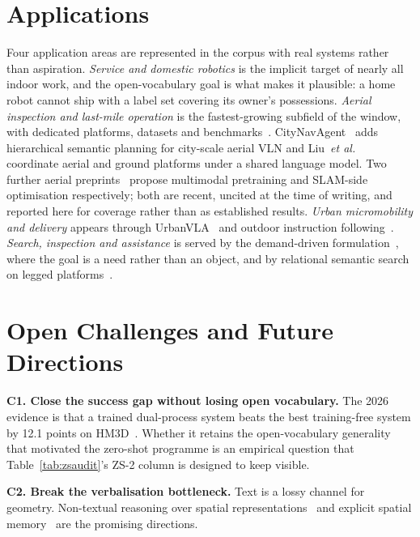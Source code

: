 \documentclass[journal]{IEEEtran}
\begin{document}
\section{Applications}\label{sec:apps}
Four application areas are represented in the corpus with real systems
rather than aspiration. \emph{Service and domestic robotics} is the implicit
target of nearly all indoor work, and the open-vocabulary goal is what makes
it plausible: a home robot cannot ship with a label set covering its
owner's possessions. \emph{Aerial inspection and last-mile operation} is the
fastest-growing subfield of the window, with dedicated platforms, datasets
and benchmarks~\cite{gao2026openfly,wang2025towards,lee2024citynav,xiao2025benchmark,chen2026aerialvla}.
CityNavAgent~\cite{zhang2025citynavagent} adds hierarchical semantic
planning for city-scale aerial VLN and
Liu~\emph{et al.}~\cite{liu2025hierarchical} coordinate aerial and ground
platforms under a shared language model. Two further aerial
preprints~\cite{gu2026multimodal,yang2026slam} propose multimodal pretraining
and SLAM-side optimisation respectively; both are recent, uncited at the time
of writing, and reported here for coverage rather than as established
results.
\emph{Urban micromobility and delivery} appears through
UrbanVLA~\cite{li2025urbanvla} and outdoor instruction
following~\cite{zhao2026bridging}. \emph{Search, inspection and
assistance} is served by the demand-driven
formulation~\cite{huang2025cogddn}, where the goal is a need rather than an
object, and by relational semantic search on legged
platforms~\cite{ginting2024seek}.

\section{Open Challenges and Future Directions}\label{sec:challenges}

\textbf{C1. Close the success gap without losing open vocabulary.} The 2026
evidence is that a trained dual-process system beats the best training-free
system by 12.1 points on HM3D~\cite{wang2026hydra}. Whether it retains the
open-vocabulary generality that motivated the zero-shot programme is an
empirical question that Table~\ref{tab:zsaudit}'s ZS-2 column is designed to
keep visible.

\textbf{C2. Break the verbalisation bottleneck.} Text is a lossy channel for
geometry. Non-textual reasoning over spatial
representations~\cite{xie2026diffusion} and explicit spatial
memory~\cite{zeng2025janusvln} are the promising directions.
\end{document}

